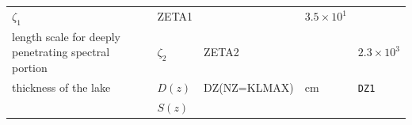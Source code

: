 \begin{longtable}[]{@{}lllll@{}}
\begin{minipage}[t]{0.19\columnwidth}
\(\zeta_1\)\strut
\end{minipage} & \begin{minipage}[t]{0.08\columnwidth}\raggedright
ZETA1\strut
\end{minipage} & \begin{minipage}[t]{0.12\columnwidth}\raggedright
\strut
\end{minipage} & \begin{minipage}[t]{0.17\columnwidth}\raggedright
\(3.5\times 10^1\)\strut
\end{minipage}\tabularnewline
\begin{minipage}[t]{0.31\columnwidth}\raggedright
length scale for deeply penetrating spectral portion\strut
\end{minipage} & \begin{minipage}[t]{0.19\columnwidth}\raggedright
\(\zeta_2\)\strut
\end{minipage} & \begin{minipage}[t]{0.08\columnwidth}\raggedright
ZETA2\strut
\end{minipage} & \begin{minipage}[t]{0.12\columnwidth}\raggedright
\strut
\end{minipage} & \begin{minipage}[t]{0.17\columnwidth}\raggedright
\(2.3\times 10^3\)\strut
\end{minipage}\tabularnewline
\begin{minipage}[t]{0.31\columnwidth}\raggedright
thickness of the lake\strut
\end{minipage} & \begin{minipage}[t]{0.19\columnwidth}\raggedright
\(D(z)\)\strut
\end{minipage} & \begin{minipage}[t]{0.08\columnwidth}\raggedright
DZ(NZ=KLMAX)\strut
\end{minipage} & \begin{minipage}[t]{0.12\columnwidth}\raggedright
\(\mathrm{cm}\)\strut
\end{minipage} & \begin{minipage}[t]{0.17\columnwidth}\raggedright
\texttt{DZ1}\strut
\end{minipage}\tabularnewline
\begin{minipage}[t]{0.31\columnwidth}\raggedright
\strut
\end{minipage} & \begin{minipage}[t]{0.19\columnwidth}\raggedright
\(S(z)\)\strut
\end{minipage} & \begin{minipage}[t]{0.08\columnwidth}\raggedright

\end{minipage}
\end{longtable}
